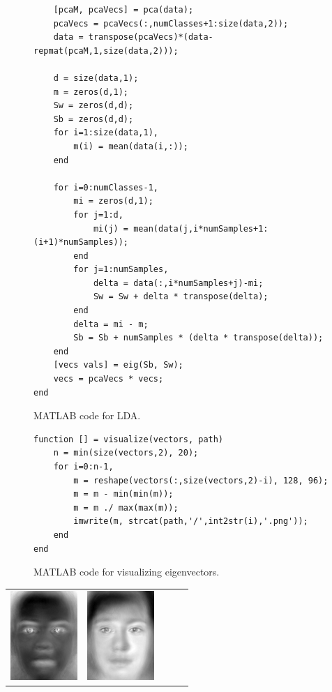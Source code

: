 \documentclass[12pt]{article}
\begin{document}
\begin{enumerate}
\begin{enumerate}
\begin{figure}[H]
\begin{verbatim}
    [pcaM, pcaVecs] = pca(data);
    pcaVecs = pcaVecs(:,numClasses+1:size(data,2));
    data = transpose(pcaVecs)*(data-repmat(pcaM,1,size(data,2)));
    
    d = size(data,1);
    m = zeros(d,1);
    Sw = zeros(d,d);
    Sb = zeros(d,d);
    for i=1:size(data,1),
        m(i) = mean(data(i,:));
    end
    
    for i=0:numClasses-1,
        mi = zeros(d,1);
        for j=1:d,
            mi(j) = mean(data(j,i*numSamples+1:(i+1)*numSamples));
        end
        for j=1:numSamples,
            delta = data(:,i*numSamples+j)-mi;
            Sw = Sw + delta * transpose(delta);
        end
        delta = mi - m;
        Sb = Sb + numSamples * (delta * transpose(delta));
    end
    [vecs vals] = eig(Sb, Sw);
    vecs = pcaVecs * vecs;
end
\end{verbatim}
\caption{MATLAB code for LDA.}
\end{figure}
\begin{figure}[H]
\begin{verbatim}
function [] = visualize(vectors, path)
    n = min(size(vectors,2), 20);
    for i=0:n-1,
        m = reshape(vectors(:,size(vectors,2)-i), 128, 96);
        m = m - min(min(m));
        m = m ./ max(max(m));
        imwrite(m, strcat(path,'/',int2str(i),'.png'));
    end
end
\end{verbatim}
\caption{MATLAB code for visualizing eigenvectors.}
\end{figure}
\begin{table}[H]
\centering
\begin{tabular}{ccccc}
\includegraphics[width=1in]{pca/0}&\includegraphics[width=1in]{pca/1}&

\end{tabular}
\end{table}
\end{enumerate}
\end{enumerate}
\end{document}

